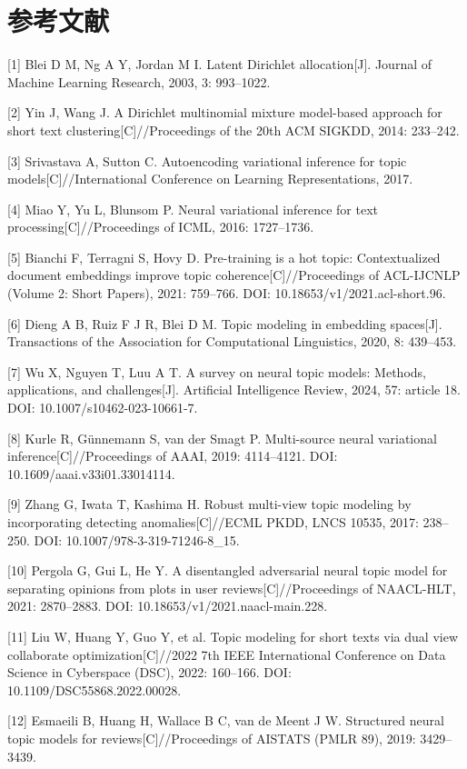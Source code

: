\documentclass{article}
\begin{document}
\section*{参考文献}

[1] Blei D M, Ng A Y, Jordan M I. Latent Dirichlet allocation[J]. Journal of Machine Learning Research, 2003, 3: 993--1022.

[2] Yin J, Wang J. A Dirichlet multinomial mixture model-based approach for short text clustering[C]//Proceedings of the 20th ACM SIGKDD, 2014: 233--242.

[3] Srivastava A, Sutton C. Autoencoding variational inference for topic models[C]//International Conference on Learning Representations, 2017.

[4] Miao Y, Yu L, Blunsom P. Neural variational inference for text processing[C]//Proceedings of ICML, 2016: 1727--1736.

[5] Bianchi F, Terragni S, Hovy D. Pre-training is a hot topic: Contextualized document embeddings improve topic coherence[C]//Proceedings of ACL-IJCNLP (Volume 2: Short Papers), 2021: 759--766. DOI: 10.18653/v1/2021.acl-short.96.

[6] Dieng A B, Ruiz F J R, Blei D M. Topic modeling in embedding spaces[J]. Transactions of the Association for Computational Linguistics, 2020, 8: 439--453.

[7] Wu X, Nguyen T, Luu A T. A survey on neural topic models: Methods, applications, and challenges[J]. Artificial Intelligence Review, 2024, 57: article 18. DOI: 10.1007/s10462-023-10661-7.

[8] Kurle R, G\"unnemann S, van der Smagt P. Multi-source neural variational inference[C]//Proceedings of AAAI, 2019: 4114--4121. DOI: 10.1609/aaai.v33i01.33014114.

[9] Zhang G, Iwata T, Kashima H. Robust multi-view topic modeling by incorporating detecting anomalies[C]//ECML PKDD, LNCS 10535, 2017: 238--250. DOI: 10.1007/978-3-319-71246-8\_15.

[10] Pergola G, Gui L, He Y. A disentangled adversarial neural topic model for separating opinions from plots in user reviews[C]//Proceedings of NAACL-HLT, 2021: 2870--2883. DOI: 10.18653/v1/2021.naacl-main.228.

[11] Liu W, Huang Y, Guo Y, et al. Topic modeling for short texts via dual view collaborate optimization[C]//2022 7th IEEE International Conference on Data Science in Cyberspace (DSC), 2022: 160--166. DOI: 10.1109/DSC55868.2022.00028.

[12] Esmaeili B, Huang H, Wallace B C, van de Meent J W. Structured neural topic models for reviews[C]//Proceedings of AISTATS (PMLR 89), 2019: 3429--3439.
\end{document}
